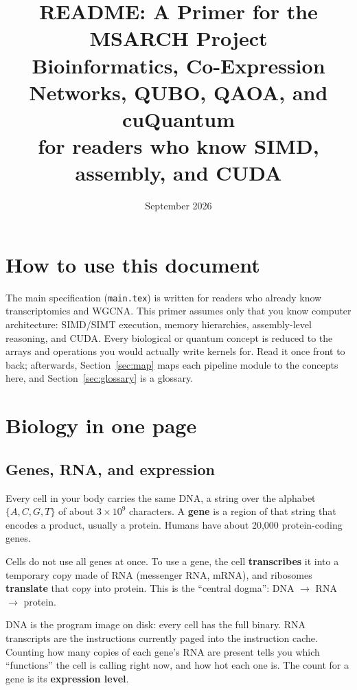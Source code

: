 \documentclass[11pt]{article}
\title{README: A Primer for the MSARCH Project\\[4pt]
\large Bioinformatics, Co-Expression Networks, QUBO, QAOA, and cuQuantum\\
for readers who know SIMD, assembly, and CUDA}
\date{September 2026}
\begin{document}
\maketitle

\section*{How to use this document}

The main specification (\texttt{main.tex}) is written for readers who already
know transcriptomics and WGCNA. This primer assumes only that you know
computer architecture: SIMD/SIMT execution, memory hierarchies, assembly-level
reasoning, and CUDA. Every biological or quantum concept is reduced to the
arrays and operations you would actually write kernels for. Read it once
front to back; afterwards, Section~\ref{sec:map} maps each pipeline module to
the concepts here, and Section~\ref{sec:glossary} is a glossary.

\tableofcontents

\section{Biology in one page}

\subsection{Genes, RNA, and expression}

Every cell in your body carries the same DNA, a string over the alphabet
$\{A,C,G,T\}$ of about $3\times10^9$ characters. A \textbf{gene} is a
region of that string that encodes a product, usually a protein. Humans have
about 20{,}000 protein-coding genes.

Cells do not use all genes at once. To use a gene, the cell
\textbf{transcribes} it into a temporary copy made of RNA (messenger RNA,
mRNA), and ribosomes \textbf{translate} that copy into protein. This is the
``central dogma'': DNA $\to$ RNA $\to$ protein.

\begin{analogy}
DNA is the program image on disk: every cell has the full binary. RNA
transcripts are the instructions currently paged into the instruction cache.
Counting how many copies of each gene's RNA are present tells you which
``functions'' the cell is calling right now, and how hot each one is. The
count for a gene is its \textbf{expression level}.
\end{analogy}
\end{document}
